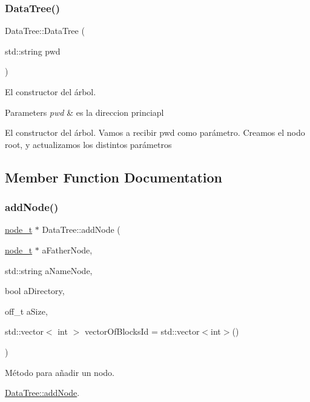\subsubsection{\texorpdfstring{Data\+Tree()}{DataTree()}}
{\footnotesize\ttfamily Data\+Tree\+::\+Data\+Tree (\begin{DoxyParamCaption}\item[{std\+::string}]{pwd }\end{DoxyParamCaption})}



El constructor del árbol. 


\begin{DoxyParams}{Parameters}
{\em pwd} & es la direccion princiapl\\
\hline
\end{DoxyParams}
El constructor del árbol. Vamos a recibir pwd como parámetro. Creamos el nodo root, y actualizamos los distintos parámetros 

\subsection{Member Function Documentation}
\mbox{\label{classDataTree_aac6f58c8502bae9254bcb476798c23fb}} 
\subsubsection{\texorpdfstring{add\+Node()}{addNode()}}
{\footnotesize\ttfamily \hyperlink{structnode__t}{node\+\_\+t} $\ast$ Data\+Tree\+::add\+Node (\begin{DoxyParamCaption}\item[{\hyperlink{structnode__t}{node\+\_\+t} $\ast$}]{a\+Father\+Node,  }\item[{std\+::string}]{a\+Name\+Node,  }\item[{bool}]{a\+Directory,  }\item[{off\+\_\+t}]{a\+Size,  }\item[{std\+::vector$<$ int $>$}]{vector\+Of\+Blocks\+Id = {\ttfamily std\+:\+:vector$<$int$>$()} }\end{DoxyParamCaption})}



Método para añadir un nodo. 

\hyperlink{classDataTree_aac6f58c8502bae9254bcb476798c23fb}{Data\+Tree\+::add\+Node}.


